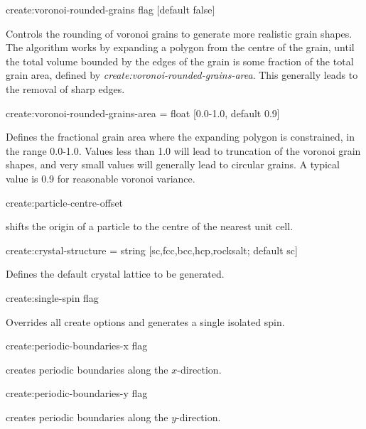 {\zicf create:voronoi-rounded-grains flag [default false]} Controls the rounding of voronoi grains to generate more realistic grain shapes. The algorithm works by expanding a polygon from the centre of the grain, until the total volume bounded by the edges of the grain is some fraction of the total grain area, defined by \textit{create:voronoi-rounded-grains-area}. This generally leads to the removal of sharp edges. \\ \par

{\zicf create:voronoi-rounded-grains-area = float [0.0-1.0, default 0.9]} Defines the fractional grain area where the expanding polygon is constrained, in the range 0.0-1.0. Values less than 1.0 will lead to truncation of the voronoi grain shapes, and very small values will generally lead to circular grains. A typical value is 0.9 for reasonable voronoi variance.\\ \par

{\zicf create:particle-centre-offset} shifts the origin of a particle to the centre of the nearest unit cell.\\ \par

{\zicf create:crystal-structure = string [sc,fcc,bcc,hcp,rocksalt; default sc]}
 Defines the default
crystal lattice to be generated.\\ \par

{\zicf create:single-spin flag} Overrides all create options and generates a single isolated spin.\\ \par

{\zicf create:periodic-boundaries-x flag} creates periodic boundaries along the $x$-direction.\\ \par

{\zicf create:periodic-boundaries-y flag} creates periodic boundaries along the $y$-direction.\\ \par

